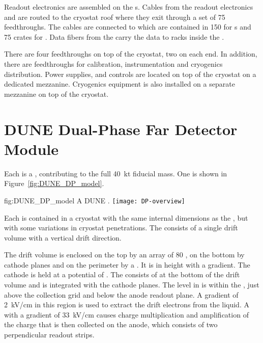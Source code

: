 Readout electronics are assembled on the s. Cables from the
readout electronics and  are routed to the cryostat roof
where they exit through a set of \num{75} feedthroughs. The cables are
connected to  which are contained in \num{150}
 for s and \num{75} crates for . Data
fibers from the  carry the data to  racks
inside the .

There are four  feedthroughs on top of the cryostat, two on
each end. In addition, there are feedthroughs for calibration,
instrumentation and cryogenics distribution. Power supplies, and
controls are located on top of the cryostat on a dedicated
mezzanine. Cryogenics equipment is also installed on a separate
mezzanine on top of the cryostat.

\section{DUNE Dual-Phase Far Detector Module}
\label{sec:fdsp-DP-module}

Each  is a \nominalmodsize {}, contributing
to the full \SI{40}{\kilo\tonne}  fiducial mass.  One
\nominalmodsize {} is shown in
Figure~\ref{fig:DUNE_DP_model}.
\begin{dunefigure}{fig:DUNE_DP_model} {A \nominalmodsize DUNE   .}
  \texttt{[image: DP-overview]}
\end{dunefigure} 

Each  is contained in a cryostat with the same internal
dimensions as the , but with some variations in cryostat
penetrations.  The  consists of a single drift volume
with a vertical drift direction.

The drift volume is enclosed on the top by an array of \num{80}
, on the bottom by cathode planes and on the perimeter by
a . It is \dpmaxdrift in height with a \dpnominaldriftfield
gradient. The cathode is held at a potential of
\dptargetdriftvoltneg{}.  The   consists of
\dpnumpmtch {} at the bottom of the drift volume and is
integrated with the cathode planes.  The  level in
 is within the , just above the collection
grid and below the anode readout plane. A gradient of
\SI{2}{\kilo\volt/\centi\meter} in this region is used to extract the
drift electrons from the liquid. A  with a gradient of
\SI{33}{\kilo\volt/\centi\meter} causes charge multiplication and
amplification of the charge that is then collected on the anode, 
which consists of two perpendicular %
readout strips.

